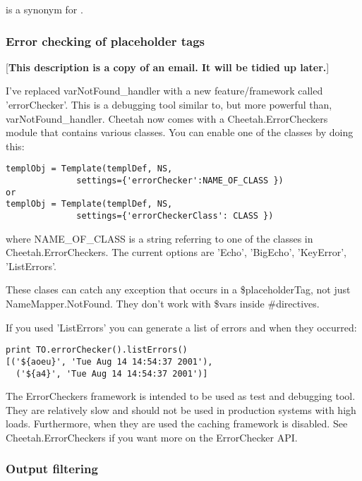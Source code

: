  is a synonym for .

\subsubsection{Error checking of placeholder tags}

[{\bf This description is a copy of an email.  It will be tidied up later.}]

I've replaced varNotFound_handler with a new feature/framework called
'errorChecker'.  This is a debugging tool similar to, but more powerful than,
varNotFound_handler.  Cheetah now comes with a Cheetah.ErrorCheckers module that
contains various classes.  You can enable one of the classes by doing this:

\begin{verbatim}
templObj = Template(templDef, NS, 
              settings={'errorChecker':NAME_OF_CLASS })
or 
templObj = Template(templDef, NS, 
              settings={'errorCheckerClass': CLASS })
\end{verbatim}

where NAME_OF_CLASS is a string referring to one of the classes in
Cheetah.ErrorCheckers.  The current options are 'Echo', 'BigEcho', 'KeyError',
'ListErrors'.

These clases can catch any exception that occurs in a \$placeholderTag, not just
NameMapper.NotFound.  They don't work with \$vars inside \#directives.

If you used 'ListErrors' you can generate a list of errors and when they
occurred:

\begin{verbatim}
print TO.errorChecker().listErrors()
[('${aoeu}', 'Tue Aug 14 14:54:37 2001'), 
  ('${a4}', 'Tue Aug 14 14:54:37 2001')]
\end{verbatim}

The ErrorCheckers framework is intended to be used as test and debugging tool.
They are relatively slow and should not be used in production systems with high
loads.  Furthermore, when they are used the caching framework is disabled. See
Cheetah.ErrorCheckers if you want more on the ErrorChecker API.




\subsubsection{Output filtering}

